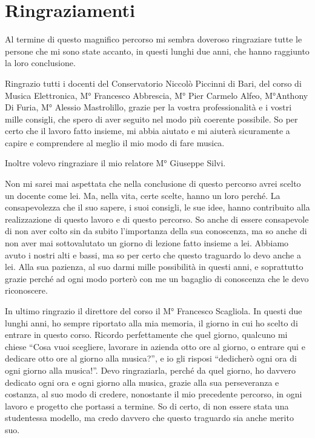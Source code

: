 
\chapter{Ringraziamenti}
Al termine di questo magnifico percorso mi sembra doveroso ringraziare tutte le persone che mi sono state accanto, in questi lunghi due anni, che hanno raggiunto la loro conclusione.
\@

Ringrazio tutti i docenti del Conservatorio Niccolò Piccinni di Bari, del corso di Musica Elettronica, M° Francesco Abbrescia, M° Pier Carmelo Alfeo, M°Anthony Di Furia, M° Alessio Mastrolillo, grazie per la vostra professionalità e i vostri mille consigli, che spero di aver seguito nel modo più coerente possibile. So per certo che il lavoro fatto insieme, mi abbia aiutato e mi aiuterà sicuramente a capire e comprendere al meglio il mio modo di fare musica. 
\@

Inoltre volevo ringraziare il mio relatore M° Giuseppe Silvi.
\@
 
Non mi sarei mai aspettata che nella conclusione di questo percorso avrei scelto un docente come lei. Ma, nella vita, certe scelte, hanno un loro perché. 
La consapevolezza che il suo sapere, i suoi consigli, le sue idee, hanno contribuito alla realizzazione di questo lavoro e di questo percorso. 
So anche di essere consapevole di non aver colto sin da subito l’importanza della sua conoscenza, ma so anche di non aver mai sottovalutato un giorno di lezione fatto insieme a lei. 
Abbiamo avuto i nostri alti e bassi, ma so per certo che questo traguardo lo devo anche a lei. Alla sua pazienza, al suo darmi mille possibilità in questi anni, e soprattutto grazie perché ad ogni modo porterò con me un bagaglio di conoscenza che le devo riconoscere. 
\@

In ultimo ringrazio il direttore del corso il M° Francesco Scagliola. 
In questi due lunghi anni, ho sempre riportato alla mia memoria, il giorno in cui ho scelto di entrare in questo corso. Ricordo perfettamente che quel giorno, qualcuno mi chiese “Cosa vuoi scegliere, lavorare in azienda otto ore al giorno, o entrare qui e dedicare otto ore al giorno alla musica?”, e io gli risposi “dedicherò ogni ora di ogni giorno alla musica!”. 
Devo ringraziarla, perché da quel giorno, ho davvero dedicato ogni ora e ogni giorno alla musica, grazie alla sua perseveranza e costanza, al suo modo di credere, nonostante il mio precedente percorso, in ogni lavoro e progetto che portassi a termine. 
So di certo, di non essere stata una studentessa modello, ma credo davvero che questo traguardo sia anche merito suo. 
\@

